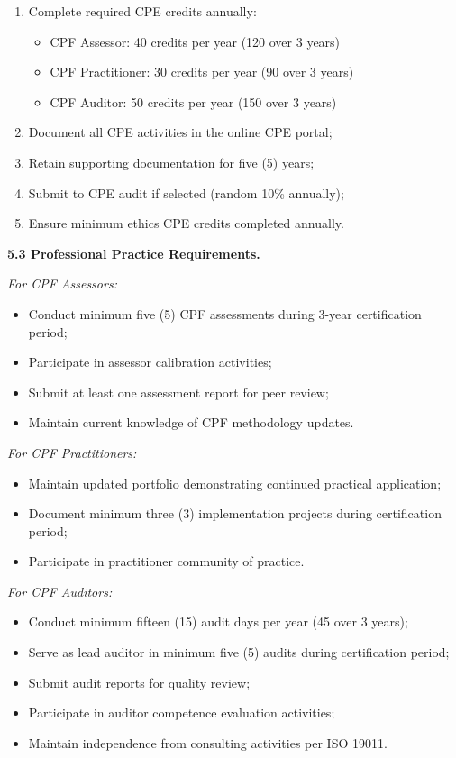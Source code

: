 \documentclass[11pt,a4paper]{article}
\begin{document}
\begin{enumerate}[label=\alph*)]
\item Complete required CPE credits annually:
\begin{itemize}
\item CPF Assessor: 40 credits per year (120 over 3 years)
\item CPF Practitioner: 30 credits per year (90 over 3 years)
\item CPF Auditor: 50 credits per year (150 over 3 years)
\end{itemize}
\item Document all CPE activities in the online CPE portal;
\item Retain supporting documentation for five (5) years;
\item Submit to CPE audit if selected (random 10\% annually);
\item Ensure minimum ethics CPE credits completed annually.
\end{enumerate}

\textbf{5.3 Professional Practice Requirements.}

\textit{For CPF Assessors:}
\begin{itemize}
\item Conduct minimum five (5) CPF assessments during 3-year certification period;
\item Participate in assessor calibration activities;
\item Submit at least one assessment report for peer review;
\item Maintain current knowledge of CPF methodology updates.
\end{itemize}

\textit{For CPF Practitioners:}
\begin{itemize}
\item Maintain updated portfolio demonstrating continued practical application;
\item Document minimum three (3) implementation projects during certification period;
\item Participate in practitioner community of practice.
\end{itemize}

\textit{For CPF Auditors:}
\begin{itemize}
\item Conduct minimum fifteen (15) audit days per year (45 over 3 years);
\item Serve as lead auditor in minimum five (5) audits during certification period;
\item Submit audit reports for quality review;
\item Participate in auditor competence evaluation activities;
\item Maintain independence from consulting activities per ISO 19011.
\end{itemize}
\end{document}
